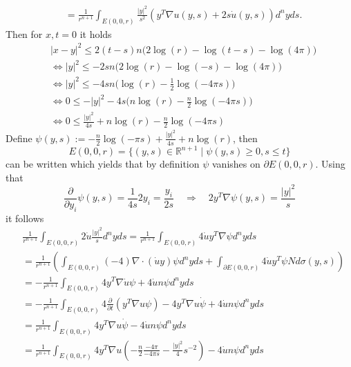 \documentclass[A4,12pt,twoside]{book}
\begin{document}
{\begin{align*}
         &= \frac{1}{r^{n+1}} \int_{E(0,0,r)}  \frac{|y|^2}{s^2} \left( y^T \nabla u(y,s) + 2 s \dot{u}(y,s) \right) d^n y ds.
    \end{align*}
    Then for $x,t=0$ it holds
    \begin{align*}
       & |x-y|^2 \leq 2 (t-s) n \big( 2 \log(r) - \log (t-s) -\log (4 \pi) \big) \\
       & \iff |y|^2 \leq - 2 s n \big( 2 \log(r) - \log (-s) -\log (4 \pi) \big) \\
        & \iff |y|^2 \leq - 4 s n \big(  \log(r)  - \frac{1}{2}\log (-4 \pi s) \big) \\
        & \iff 0\leq - |y|^2 - 4 s  \big( n \log(r)  - \frac{n}{2}\log (-4 \pi s) \big) \\
         & \iff 0  \leq  \frac{|y|^2}{4s} +   n \log(r)  - \frac{n}{2}\log (-4 \pi s) 
    \end{align*}
    Define $\psi (y,s) := - \frac{n}{2} \log (- \pi s) + \frac{|y|^2}{4s} + n \log (r)$, then 
    \[
    E(0,0,r) = \{ (y,s) \in \mathbb{R}^{n+1} \mid \psi (y,s) \geq 0, s \leq t \}
    \]
    can be written which yields that by definition $\psi$ vanishes on $\partial E(0,0,r)$. Using that 
    \[
    \frac{\partial}{\partial y_i} \psi (y,s) = \frac{1}{4s} 2 y_i= \frac{y_i}{2s} \quad \Rightarrow \quad 2 y^T \nabla \psi (y,s)= \frac{|y|^2}{s}
    \]
    it follows
    \begin{align*}
        &\frac{1}{r^{n+1}} \int_{E(0,0,r)} 2 \dot{u} \frac{|y|^2}{s} d^n y ds = \frac{1}{r^{n+1}} \int_{E(0,0,r)} 4 \dot{u} y^T \nabla \psi  d^n y ds \\
        &=  \frac{1}{r^{n+1}} \left(  \int_{E(0,0,r)} (-4) \nabla \cdot ( \dot{u} y) \psi  d^n y ds +  \int_{\partial E(0,0,r)} 4 \dot{u} y^T \psi N  d \sigma (y,s) \right) \\
        &=  - \frac{1}{r^{n+1}}  \int_{E(0,0,r)} 4   y^T \nabla  \dot{u}  \psi + 4   \dot{u} n \psi  d^n y ds \\
        &=  - \frac{1}{r^{n+1}}  \int_{E(0,0,r)} 4  \frac{\partial}{\partial t} \left(  y^T \nabla u \psi  \right) - 4 y^T \nabla u \dot{\psi}  + 4   \dot{u} n \psi  d^n y ds \\
         &=   \frac{1}{r^{n+1}}  \int_{E(0,0,r)} 4  y^T \nabla u \dot{\psi}  - 4   \dot{u} n \psi  d^n y ds \\
         &=   \frac{1}{r^{n+1}}  \int_{E(0,0,r)}   4y^T \nabla u \left( - \frac{n}{2} \frac{-4 \pi}{-4 \pi s} - \frac{|y|^2}{4} s^{-2} \right) - 4   \dot{u} n \psi  d^n y ds \\

\end{align*}}
\end{document}
